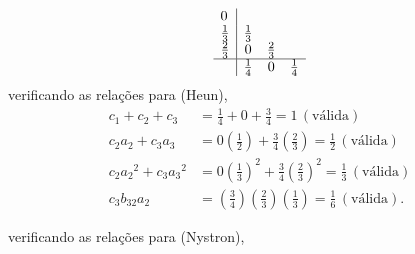 \documentclass[a4paper,12pt]{article}
\begin{document}
{\arraycolsep=3.4pt\def\arraystretch{1.4}
\[
	\begin{array}{l|ccc} 
		0 &  & & \\
		\frac{1}{3} & \frac{1}{3} & & \\
		\frac{2}{3} & 0 & \frac{2}{3}& \\
		\hline
		&\frac{1}{4} & 0 & \frac{1}{4}
	\end{array}
\]
}
verificando as rela\c c\~oes para (Heun),
\begin{align*}
	c_1 + c_2 + c_3 &= \frac{1}{4} + 0 + \frac{3}{4} = 1 \hspace{2pt}(\textrm{v\'alida})\\
	c_2 a_2 + c_3 a_3 &= 0\left (\frac{1}{2} \right) + \frac{3}{4} \left (\frac{2}{3} \right ) = \frac{1}{2} \hspace{2pt}(\textrm{v\'alida})\\
	c_2 {a_2}^{2} + c_3 {a_3}^{2}&= 0 \left ( \frac{1}{3}\right )^{2} +  \frac{3}{4} \left ( \frac{2}{3}\right )^{2} =
	\frac{1}{3}\hspace{2pt}(\textrm{v\'alida})\\ 
	c_3 b_{32} a_2 &=\left (\frac{3}{4}\right )\left (\frac{2}{3}\right )\left (\frac{1}{3}\right ) =
	\frac{1}{6}\hspace{2pt}(\textrm{v\'alida}).
\end{align*}

verificando as rela\c c\~oes para (Nystron),
\end{document}

